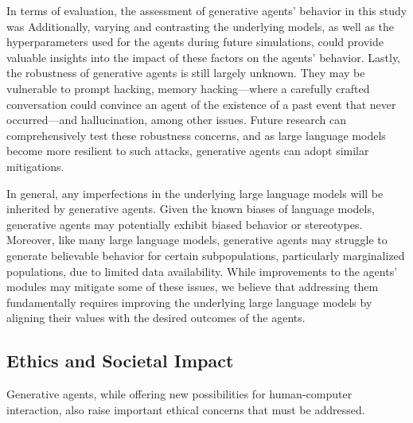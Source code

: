 In terms of evaluation, the assessment of generative agents' behavior in this study was {\color{black}{limited to a relatively short timescale and a baseline human crowdworker condition. While the crowdworker condition provided a helpful comparison point, it did not represent the maximal human performance that could serve as the gold standard in terms of believability. Future research should aim to observe the behavior of generative agents over an extended period to gain a more comprehensive understanding of their capabilities and establish rigorous benchmarks for more effective performance testing.}} Additionally, varying and contrasting the underlying models, as well as the hyperparameters used for the agents during future simulations, could provide valuable insights into the impact of these factors on the agents' behavior. Lastly, the robustness of generative agents is still largely unknown. They may be vulnerable to prompt hacking, memory hacking---where a carefully crafted conversation could convince an agent of the existence of a past event that never occurred---and hallucination, among other issues. Future research can comprehensively test these robustness concerns, and as large language models become more resilient to such attacks, generative agents can adopt similar mitigations.

In general, any imperfections in the underlying large language models will be inherited by generative agents. Given the known biases of language models, generative agents may potentially exhibit biased behavior or stereotypes. Moreover, like many large language models, generative agents may struggle to generate believable behavior for certain subpopulations, particularly marginalized populations, due to limited data availability. While improvements to the agents' modules may mitigate some of these issues, we believe that addressing them fundamentally requires improving the underlying large language models by aligning their values with the desired outcomes of the agents.

\subsection{Ethics and Societal Impact} Generative agents, while offering new possibilities for human-computer interaction, also raise important ethical concerns that must be addressed. {}

